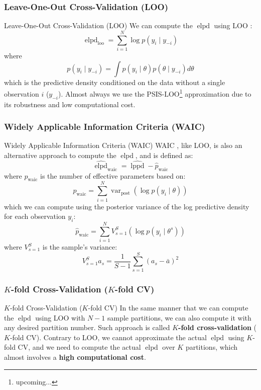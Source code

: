 \subsubsection{Leave-One-Out Cross-Validation (LOO)}
\begin{frame}{Leave-One-Out Cross-Validation (LOO)}
	We can compute the $\operatorname{elpd}$ using LOO
	\parencite{vehtariPracticalBayesianModel2015}:
	$$
		\operatorname{elpd}_{\text{loo}} = \sum_{i=1}^N \log p(y_i \mid y_{-i})
	$$
	where
	$$
		p(y_i \mid y_{-i}) = \int p(y_i \mid \theta) p(\theta \mid y_{-i}) d \theta
	$$
	which is the predictive density conditioned on the data without a single observation $i$ ($y_{-i}$).
	Almost always we use the PSIS-LOO\footnote{upcoming...} approximation
	due to its robustness and low computational cost.
\end{frame}

\subsubsection{Widely Applicable Information Criteria (WAIC)}
\begin{frame}{Widely Applicable Information Criteria (WAIC)}
	\footnotesize
	WAIC \parencite{watanabe2010asymptotic}, like LOO,
	is also an alternative approach to compute the $\operatorname{elpd}$,
	and is defined as:
	$$
		\widehat{\operatorname{elpd}}_{\text{waic}} = \widehat{\operatorname{lppd}} - \widehat{p}_{\text{waic}}
	$$
	where $\widehat{p}_{\text{waic}}$ is the number of effective parameters based on:
	$$
		\widehat{p}_{\text{waic}} = \sum_{i=1}^N \operatorname{var}_{\text{post}} (\log p(y_i \mid \theta))
	$$
	which we can compute using the posterior variance of the log predictive density for each observation $y_i$:
	$$
		\widehat{p}_{\text{waic}} = \sum_{i=1}^N V^S_{s=1} (\log p(y_i \mid \theta^s))
	$$
	where $V^S_{s=1}$ is the sample's variance:
	$$
		V^S_{s=1} a_s = \frac{1}{S-1} \sum^S_{s=1} (a_s - \bar{a})^2
	$$
\end{frame}

\subsubsection{$K$-fold Cross-Validation ($K$-fold CV)}
\begin{frame}{$K$-fold Cross-Validation ($K$-fold CV)}
	In the same manner that we can compute the $\operatorname{elpd}$
	using LOO with $N-1$ sample partitions,
	we can also compute it with any desired partition number.
	\vfill
	Such approach is called \textbf{$K$-fold cross-validation} ($K$-fold CV).
	\vfill
	Contrary to LOO, we cannot approximate the actual $\operatorname{elpd}$
	using $K$-fold CV,
	and we need to compute the actual $\operatorname{elpd}$ over $K$ partitions,
	which almost involves a \textbf{high computational cost}.
\end{frame}

